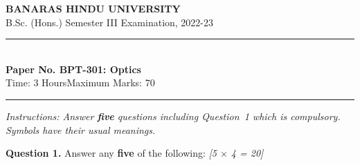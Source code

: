 \documentclass[11pt,a4paper]{article}
\newcommand{\pts}[1]{\hfill   \textit{[#1]}}
\begin{document}
\begin{center}
  {\large\bfseries BANARAS HINDU UNIVERSITY}\\[2pt]
  {\normalsize B.Sc. (Hons.) Semester III Examination, 2022-23}\\[6pt]
  \rule{0.8\linewidth}{0.5pt}\\[6pt]
  {\large\bfseries Paper No. BPT-301: Optics}\\[4pt]
  {\normalsize Time: 3 Hours\hfill Maximum Marks: 70}
\end{center}
\rule{\linewidth}{0.4pt}
\smallskip



\noindent   \textit{Instructions: Answer   \textbf{five} questions including Question~1 which is compulsory. Symbols have their usual meanings.}
\bigskip




\noindent   \textbf{Question 1.} Answer any   \textbf{five} of the following: \pts{5 $ \times$ 4 = 20}
\end{document}
